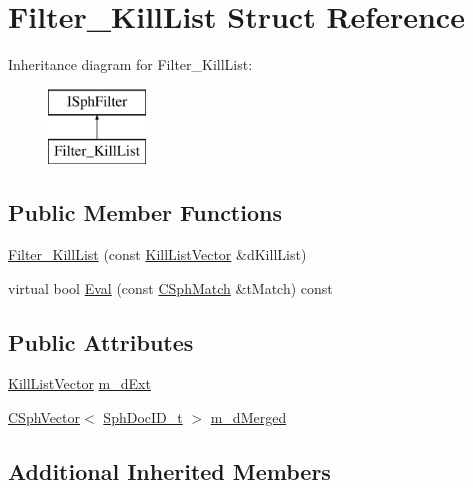 \hypertarget{structFilter__KillList}{\section{Filter\-\_\-\-Kill\-List Struct Reference}
\label{structFilter__KillList}
}
Inheritance diagram for Filter\-\_\-\-Kill\-List\-:\begin{figure}[H]
\begin{center}
\leavevmode
\includegraphics[height=2.000000cm]{structFilter__KillList}
\end{center}
\end{figure}
\subsection*{Public Member Functions}
\begin{DoxyCompactItemize}
\item 
\hyperlink{structFilter__KillList_aaba094b631a0d51b4223131353fdc693}{Filter\-\_\-\-Kill\-List} (const \hyperlink{sphinx_8h_a1510ca22159d6c94f7fd300b5d3be431}{Kill\-List\-Vector} \&d\-Kill\-List)
\item 
virtual bool \hyperlink{structFilter__KillList_a8910a8bfe81714f755c60fdad6de1230}{Eval} (const \hyperlink{classCSphMatch}{C\-Sph\-Match} \&t\-Match) const 
\end{DoxyCompactItemize}
\subsection*{Public Attributes}
\begin{DoxyCompactItemize}
\item 
\hyperlink{sphinx_8h_a1510ca22159d6c94f7fd300b5d3be431}{Kill\-List\-Vector} \hyperlink{structFilter__KillList_ae2bb5f67fc6535dca0c88db07f28a2e3}{m\-\_\-d\-Ext}
\item 
\hyperlink{classCSphVector}{C\-Sph\-Vector}$<$ \hyperlink{sphinx_8h_a3176771631c12a9e4897272003e6b447}{Sph\-Doc\-I\-D\-\_\-t} $>$ \hyperlink{structFilter__KillList_a94ee2630565ab56494bbbe33033bd59c}{m\-\_\-d\-Merged}
\end{DoxyCompactItemize}
\subsection*{Additional Inherited Members}



